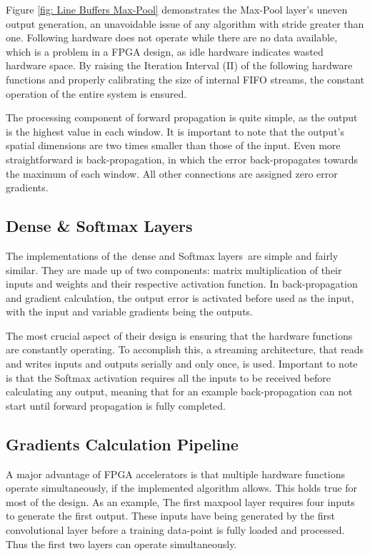 Figure \ref{fig: Line Buffers Max-Pool} demonstrates the Max-Pool layer's uneven output generation, an unavoidable issue of any algorithm with stride greater than one. Following hardware does not operate while there are no data available, which is a problem in a FPGA design, as idle hardware indicates wasted hardware space. By raising the Iteration Interval (II) of the following hardware functions and properly calibrating the size of internal FIFO streams, the constant operation of the entire system is ensured.

The processing component of forward propagation is quite simple, as the output is the highest value in each window. It is important to note that the output's spatial dimensions are two times smaller than those of the input. Even more straightforward is back-propagation, in which the error back-propagates towards the maximum of each window. All other connections are assigned zero error gradients.

\subsection{Dense \& Softmax Layers}
The implementations of the dense and Softmax layers are simple and fairly similar. They are made up of two components: matrix multiplication of their inputs and weights and their respective activation function. In back-propagation and gradient calculation, the output error is activated before used as the input, with the input and variable gradients being the outputs.

The most crucial aspect of their design is ensuring that the hardware functions are constantly operating. To accomplish this, a streaming architecture, that reads and writes inputs and outputs serially and only once, is used. Important to note is that the Softmax activation requires all the inputs to be received before calculating any output, meaning that for an example back-propagation can not start until forward propagation is fully completed.

\subsection{Gradients Calculation Pipeline} %
A major advantage of FPGA accelerators is that multiple hardware functions operate simultaneously, if the implemented algorithm allows. This holds true for most of the design. As an example, The first maxpool layer requires four inputs to generate the first output. These inputs have being generated by the first convolutional layer before a training data-point is fully loaded and processed. Thus the first two layers can operate simultaneously. %

